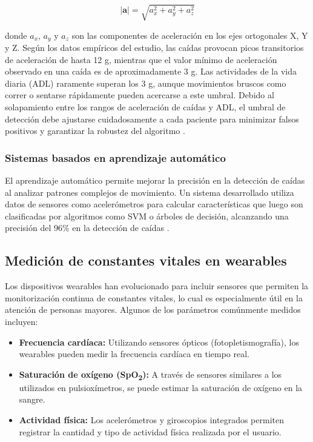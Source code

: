 \documentclass[12pt, a4paper]{article}
\begin{document}
	\[
	|\mathbf{a}| = \sqrt{a_x^2 + a_y^2 + a_z^2}
	\]
	
	donde \(a_x\), \(a_y\) y \(a_z\) son las componentes de aceleración en los ejes ortogonales X, Y y Z. Según los datos empíricos del estudio, las caídas provocan picos transitorios de aceleración de hasta 12 g, mientras que el valor mínimo de aceleración observado en una caída es de aproximadamente 3 g. Las actividades de la vida diaria (ADL) raramente superan los 3 g, aunque movimientos bruscos como correr o sentarse rápidamente pueden acercarse a este umbral. Debido al solapamiento entre los rangos de aceleración de caídas y ADL, el umbral de detección debe ajustarse cuidadosamente a cada paciente para minimizar falsos positivos y garantizar la robustez del algoritmo \cite{ucm2015}.
	
	\subsubsection{Sistemas basados en aprendizaje automático}
	
	El aprendizaje automático permite mejorar la precisión en la detección de caídas al analizar patrones complejos de movimiento. Un sistema desarrollado utiliza datos de sensores como acelerómetros para calcular características que luego son clasificadas por algoritmos como SVM o árboles de decisión, alcanzando una precisión del 96\% en la detección de caídas \cite{lauro2021}.
	
	
	\subsection{Medición de constantes vitales en wearables}
	
	Los dispositivos wearables han evolucionado para incluir sensores que permiten la monitorización continua de constantes vitales, lo cual es especialmente útil en la atención de personas mayores. Algunos de los parámetros comúnmente medidos incluyen:
	
	\begin{itemize}
		\item \textbf{Frecuencia cardíaca:} Utilizando sensores ópticos (fotopletismografía), los wearables pueden medir la frecuencia cardíaca en tiempo real.
		\item \textbf{Saturación de oxígeno (SpO\textsubscript{2}):} A través de sensores similares a los utilizados en pulsioxímetros, se puede estimar la saturación de oxígeno en la sangre.
		\item \textbf{Actividad física:} Los acelerómetros y giroscopios integrados permiten registrar la cantidad y tipo de actividad física realizada por el usuario.
	\end{itemize}
	
\end{document}

